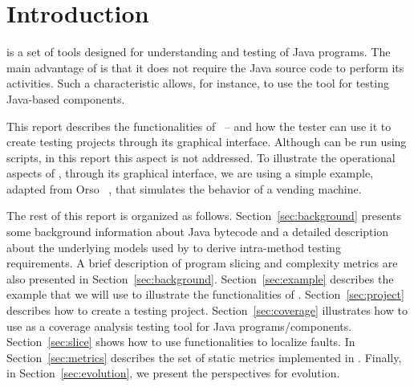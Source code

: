 \section{Introduction}\label{sec:introduction}

\toolname is a set of tools designed for understanding and testing
of Java programs. The main advantage of \toolname is that it does
not require the Java source code to perform its activities. Such a
characteristic allows, for instance, to use the tool for testing
Java-based components.

This report describes the functionalities of \toolname\ --
\version and how the tester can use it to create testing projects
through its graphical interface. Although \toolname can be run
using scripts, in this report this aspect is not addressed. To
illustrate the operational aspects of \toolname, through its
graphical interface, we are using a simple example, adapted from
Orso \etal~\cite{Orso01UCMS}, that simulates the behavior of a
vending machine.

The rest of this report is organized as follows.
Section~\ref{sec:background} presents some background information
about Java bytecode and a detailed description about the
underlying models used by \toolname to derive intra-method testing
requirements. A brief description of program slicing and
complexity metrics are also presented in
Section~\ref{sec:background}. Section~\ref{sec:example} describes
the example that we will use to illustrate the functionalities of
\toolname. Section~\ref{sec:project} describes how to create a
testing project. Section~\ref{sec:coverage} illustrates how to use
\toolname as a coverage analysis testing tool for Java
programs/components. Section~\ref{sec:slice} shows how to use
\toolname functionalities to localize faults. In
Section~\ref{sec:metrics} describes the set of static metrics
implemented in \toolname. Finally, in Section~\ref{sec:evolution},
we present the perspectives for \toolname evolution.
